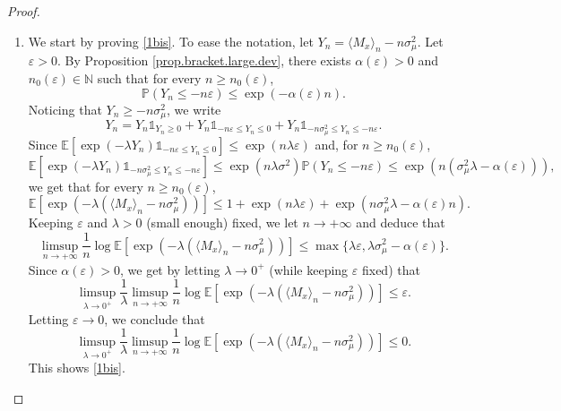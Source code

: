 \documentclass[10pt]{amsart}
\newenvironment{enumeratei}
{\bgroup\def\theenumi{\roman{enumi}}\def\theenumii{\arabic{enumii}}\begin{enumerate}}
{\end{enumerate}\egroup}
\let\epsilon\varepsilon
\theoremstyle{plain}
\theoremstyle{definition}
\newcommand\E{\mathbb{E}}
\newcommand\p{\mathbb{P}}
\newcommand\N{\mathbb{N}}
\begin{document}
\begin{proof}
\begin{enumeratei}
\item
We start by proving \eqref{1bis}.
To ease the notation, let $Y_n=\langle M_x\rangle_n-n\sigma_{\mu}^2$. Let $\epsilon>0$. By Proposition \ref{prop.bracket.large.dev}, there exists $\alpha(\epsilon)>0$ and $n_0(\epsilon)\in \N$ such that for every $n\geq n_0(\epsilon)$,
\[
\p(Y_n\leq -n\epsilon)\leq \exp(-\alpha(\epsilon) n).
\]
Noticing that $Y_n\geq - n\sigma^2_\mu$, we write
\[
Y_n=Y_n\mathds{1}_{Y_n\geq 0}+
Y_n\mathds{1}_{-n\epsilon \leq Y_n\leq 0}
+ Y_n\mathds{1}_{-n\sigma^2_\mu \leq Y_n\leq -n\epsilon}.
\]
Since $\E[\exp(-\lambda Y_n) \mathds{1}_{-n\epsilon \leq Y_n\leq 0}]\leq \exp(n\lambda \epsilon)$ and, for $n\geq n_0(\epsilon)$,
\[
\E[\exp(-\lambda Y_n)\mathds{1}_{-n\sigma_\mu^2 \leq Y_n\leq -n\epsilon}]\leq \exp(n\lambda \sigma^2)\p(Y_n\leq -n\epsilon)\leq \exp(n (\sigma_\mu^2\lambda-\alpha(\epsilon))),
\]
we get that for every $n\geq n_0(\epsilon)$,
\[
\E[\exp(-\lambda(\langle M_x\rangle_n - n\sigma_\mu^2))]\leq 1+ \exp(n\lambda \epsilon)+\exp(n\sigma_\mu^2 \lambda-\alpha(\epsilon)n).
\]
Keeping $\epsilon$ and $\lambda>0$ (small enough) fixed, we let $n\to +\infty$ and deduce that
\[
\limsup_{n\to +\infty}
\frac{1}{n}\log \E[\exp(-\lambda(\langle M_x\rangle_n - n\sigma_\mu^2))]\leq \max\{\lambda \epsilon, \lambda \sigma_\mu^2-\alpha(\epsilon)\}.
\]
Since $\alpha(\epsilon)>0$, we get by letting $\lambda\to 0^+$ (while keeping $
\epsilon$ fixed) that
\[
\limsup_{\lambda\to 0^+}\frac{1}{\lambda}\limsup_{n\to +\infty}
\frac{1}{n}\log \E[\exp(-\lambda(\langle M_x\rangle_n - n\sigma_\mu^2))]\leq \epsilon.
\]
Letting $\epsilon\to 0$, we conclude that
\[
\limsup_{\lambda\to 0^+}\frac{1}{\lambda}\limsup_{n\to +\infty}
\frac{1}{n}\log \E[\exp(-\lambda(\langle M_x\rangle_n - n\sigma_\mu^2))]\leq 0.
\]
This shows \eqref{1bis}.


\end{enumeratei}
\end{proof}
\end{document}
